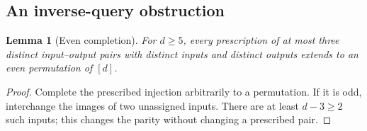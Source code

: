 \documentclass[11pt,a4paper]{article}
\newtheorem{lemma}[theorem]{Lemma}
\theoremstyle{definition}
\theoremstyle{remark}
\begin{document}
\subsection{An inverse-query obstruction}

\begin{lemma}[Even completion]\label{lem:even-completion}
For $d\ge5$, every prescription of at most three distinct
input--output pairs with distinct inputs and distinct outputs
extends to an even permutation of $[d]$.
\end{lemma}
\begin{proof}
Complete the prescribed injection arbitrarily to a permutation.
If it is odd, interchange the images of two unassigned inputs.
There are at least $d-3\ge2$ such inputs; this changes the parity
without changing a prescribed pair.
\end{proof}
\end{document}
